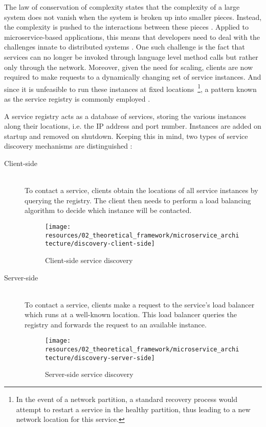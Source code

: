 The law of conservation of complexity states that the complexity of a large system does not vanish when the system is broken up into smaller pieces. Instead, the complexity is pushed to the interactions between these pieces \cite[p.~38]{messina2016simplified} \cite[p.~114]{thones2015microservices}. Applied to microservice-based applications, this means that developers need to deal with the challenges innate to distributed systems \cite[p.~24]{dmitry2014micro} \cite[p.~589]{villamizar2015evaluating}. One such challenge is the fact that services can no longer be invoked through language level method calls but rather only through the network. Moreover, given the need for scaling, clients are now required to make requests to a dynamically changing set of service instances. And since it is unfeasible to run these instances at fixed locations~\footnote{In the event of a network partition, a standard recovery process would attempt to restart a service in the healthy partition, thus leading to a new network location for this service.}, a pattern known as the service registry is commonly employed \cite[p.~37]{messina2016simplified}.

A service registry acts as a database of services, storing the various instances along their locations, i.e. the \acs{IP} address and port number. Instances are added on startup and removed on shutdown. Keeping this in mind, two types of service discovery mechanisms are distinguished \cite[p.~46]{khan2017key}:

\begin{description}
  \item[Client-side]
  \hfill \\
  To contact a service, clients obtain the locations of all service instances by querying the registry. The client then needs to perform a load balancing algorithm to decide which instance will be contacted.

\begin{figure}[hbt]
  \centering
  \texttt{[image: resources/02\_theoretical\_framework/microservice\_architecture/discovery-client-side]}
  \caption[Client-side service discovery]{Client-side service discovery \cite[p.~37]{messina2016simplified}}
  \label{fig:client-side-discovery}
\end{figure}

\FloatBarrier

  \item[Server-side]
  \hfill \\
  To contact a service, clients make a request to the service's load balancer which runs at a well-known location. This load balancer queries the registry and forwards the request to an available instance.

\begin{figure}[hbt]
  \centering
  \texttt{[image: resources/02\_theoretical\_framework/microservice\_architecture/discovery-server-side]}
  \caption[Server-side service discovery]{Server-side service discovery \cite[p.~37]{messina2016simplified}}
  \label{fig:server-side-discovery}
\end{figure}

\FloatBarrier

\end{description}

